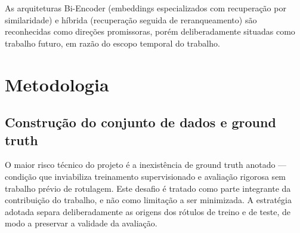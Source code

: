 \documentclass[
    article,
    12pt,
    oneside,
    a4paper,
    english,
    brazilian
    ]{abntex2}
\numberwithin{equation}{section}
\newenvironment{dica}{%
    \par\medskip
    \color{blue!60!black}\small\itshape
}{%
    \par\medskip
}
\begin{document}
As arquiteturas Bi-Encoder (embeddings especializados com recuperação por similaridade) e híbrida (recuperação seguida de reranqueamento) são reconhecidas como direções promissoras, porém deliberadamente situadas como trabalho futuro, em razão do escopo temporal do trabalho.

\section{Metodologia}

%

\subsection{Construção do conjunto de dados e ground truth}
\label{sec:construcao-dataset}

O maior risco técnico do projeto é a inexistência de ground truth anotado --- condição que inviabiliza treinamento supervisionado e avaliação rigorosa sem trabalho prévio de rotulagem. Este desafio é tratado como parte integrante da contribuição do trabalho, e não como limitação a ser minimizada. A estratégia adotada separa deliberadamente as origens dos rótulos de treino e de teste, de modo a preservar a validade da avaliação.
\end{document}
